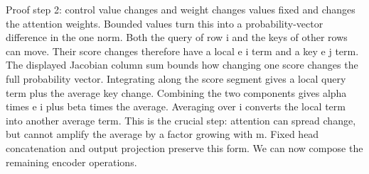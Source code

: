 \documentclass[aspectratio=169,11pt]{beamer}
\begin{document}
\begin{frame}{Proof step 2: control value changes and weight changes}
{values fixed and changes the attention weights. Bounded values
turn this into a probability-vector difference in the one norm.
Both the query of row i and the keys of other rows can move.
Their score changes therefore have a local e i term and a key e j
term. The displayed Jacobian column sum bounds how changing one
score changes the full probability vector. Integrating along the
score segment gives a local query term plus the average key change.
Combining the two components gives alpha times e i plus beta times
the average. Averaging over i converts the local term into another
average term. This is the crucial step: attention can spread change,
but cannot amplify the average by a factor growing with m.
Fixed head concatenation and output projection preserve this form.
We can now compose the remaining encoder operations.}
\end{frame}
\end{document}
